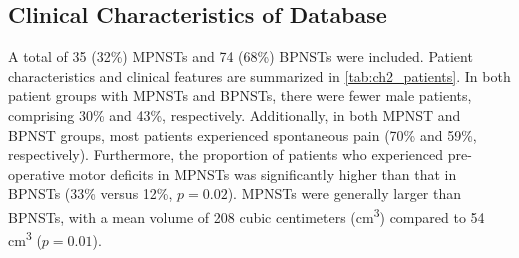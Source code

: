 \subsection{Clinical Characteristics of Database}
A total of 35 (32\%) MPNSTs and 74 (68\%) BPNSTs were included.
Patient characteristics and clinical features are summarized in \autoref{tab:ch2_patients}.
In both patient groups with MPNSTs and BPNSTs, there were fewer male patients, comprising 30\% and 43\%, respectively.
Additionally, in both MPNST and BPNST groups, most patients experienced spontaneous pain (70\% and 59\%, respectively).
Furthermore, the proportion of patients who experienced pre-operative motor deficits in MPNSTs was significantly higher than that in BPNSTs (33\% versus 12\%, $p = 0.02$).
MPNSTs were generally larger than BPNSTs, with a mean volume of 208 cubic centimeters (cm\textsuperscript{3}) compared to 54 cm\textsuperscript{3} ($p = 0.01$).

